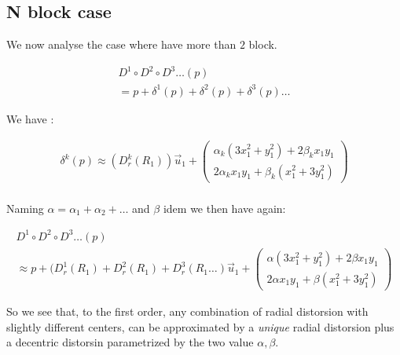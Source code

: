 
\subsection{N block case}

We now analyse the case where have more than $2$ block.  


\begin{equation}
\begin{multlined}
	D^1 \circ D^2 \circ D^3 \dots (p)  \\
	= p +\delta^1(p) +\delta^2(p) + \delta^3(p) \dots 
\end{multlined}
\end{equation}

We have :

\begin{equation}
\begin{multlined}
        \delta^k(p)  
	\approx  (D^k_r(R_1))  \vec{u}_1  
          +\begin{pmatrix} \alpha_k(3 x_1^2 + y_1^2 ) +2\beta_k x_1 y_1   \\ 2  \alpha_k x_1 y_1 +  \beta_k( x_1^2 + 3 y_1^2)  \end{pmatrix} \\
\end{multlined}
\end{equation}

Naming $\alpha =  \alpha_1+\alpha_2 + \dots$ and $\beta$ idem we then have again:


\begin{equation}
\begin{multlined}
	D^1 \circ D^2 \circ D^3 \dots (p)  \\
	\approx  p + (D^1_r(R_1) + D^2_r(R_1) +  D^3_r(R_1 \dots )  \vec{u}_1
	  +\begin{pmatrix} \alpha(3 x_1^2 + y_1^2 ) +2\beta x_1 y_1   \\ 2  \alpha x_1 y_1 +  \beta( x_1^2 + 3 y_1^2)  \end{pmatrix}
\end{multlined}
\end{equation}

So we see that, to the first order, any combination of radial distorsion with slightly different centers,
can be approximated by a \emph{unique} radial distorsion plus a decentric distorsin parametrized by the two value $\alpha,\beta$.



